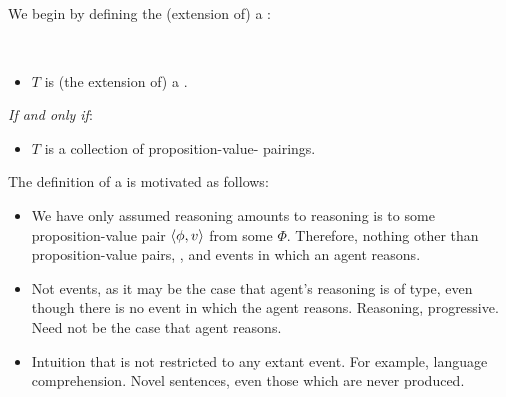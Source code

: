 \subsection{}
\label{cha:typical:sec:tR:ToRdef}

\begin{note}
  We begin by defining the (extension of) a \tor{}:

  \begin{definition}[\tor{2}]
    \label{def:tor}
    \mbox{ }
    \vspace{-\baselineskip}
    \begin{itemize}
    \item
      \(T\) is (the extension of) a \emph{}.
    \end{itemize}

    \emph{If and only if}:

    \begin{itemize}
    \item
      \(T\) is a collection of proposition-value-\pool{} pairings.
    \end{itemize}
    \vspace{-\baselineskip}
  \end{definition}

  The definition of a \tor{} is motivated as follows:
  \begin{itemize}
  \item
    We have only assumed reasoning amounts to reasoning is to some proposition-value pair \(\langle \phi, v \rangle\) from some \pool{} \(\Phi\).
    Therefore, nothing other than proposition-value pairs, , and events in which an agent reasons.
  \item
    Not events, as it may be the case that agent's reasoning is of type, even though there is no event in which the agent reasons.
    Reasoning, progressive.
    Need not be the case that agent reasons.
  \item
    Intuition that \tor{} is not restricted to any extant event.
    For example, language comprehension.
    Novel sentences, even those which are never produced.
  \end{itemize}
\end{note}

